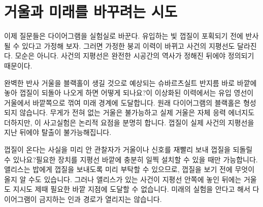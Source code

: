 \begin{classroomqa}
\end{classroomqa}

\section{거울과 미래를 바꾸려는 시도}

이제 질문들은 다이어그램을 실험실로 바꾼다. 유입하는 빛 껍질이 포획되기 전에 반사될 수 있다고 가정해 보자. 그러면 가정한 붕괴 이력이 바뀌고 사건의 지평선도 달라진다. 모순은 아니다. 사건의 지평선은 완전한 시공간의 역사가 정해진 뒤에야 정의되기 때문이다.

\begin{classroomqa}완벽한 반사 거울을 블랙홀이 생길 것으로 예상되는 슈바르츠실트
반지름 바로 바깥에 놓아 껍질이 되돌아 나오게 하면 어떻게 되나요?\audiencequestion{
}이 이상화된 이력에서는 유입 영선이 거울에서 바깥쪽으로 꺾여
미래 경계에 도달합니다. 원래 다이어그램의 블랙홀은 형성되지 않습니다.
무게가 전혀 없는 거울은 불가능하고 실제 거울은 자체 응력 에너지도 더하지만,
이 사고실험은 논리적 요점을 분명히 합니다. 껍질이 실제 사건의 지평선을 지난
뒤에야 탈출이 불가능해집니다.
\end{classroomqa}

\begin{classroomqa}껍질이 온다는 사실을 미리 안 관찰자가 거울이나 신호를
재빨리 보내 껍질을 되돌릴 수 있나요?\audiencequestion{
}필요한 장치를 지평선 바깥에 충분히 일찍 설치할 수 있을 때만
가능합니다. 앨리스는 밥에게 껍질을 보내도록 미리 부탁할 수 있으므로, 껍질을
보기 전에 무엇이 올지 알 수도 있습니다. 그러나 앨리스가 있는 사건이 지평선
안쪽에 놓인 뒤에는 거울도 지시도 제때 필요한 바깥 지점에 도달할 수 없습니다.
미래의 실험을 안다고 해서 다이어그램이 금지하는 인과 경로가 열리지는 않습니다.
\end{classroomqa}

